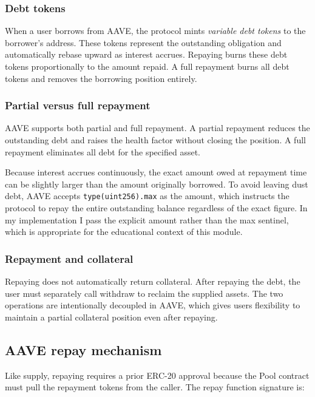 \subsubsection{Debt tokens}

When a user borrows from AAVE, the protocol mints \textit{variable debt tokens} to the borrower's address. These tokens represent the outstanding obligation and automatically rebase upward as interest accrues. Repaying burns these debt tokens proportionally to the amount repaid. A full repayment burns all debt tokens and removes the borrowing position entirely.

\subsubsection{Partial versus full repayment}

AAVE supports both partial and full repayment. A partial repayment reduces the outstanding debt and raises the health factor without closing the position. A full repayment eliminates all debt for the specified asset.

Because interest accrues continuously, the exact amount owed at repayment time can be slightly larger than the amount originally borrowed. To avoid leaving dust debt, AAVE accepts \texttt{type(uint256).max} as the amount, which instructs the protocol to repay the entire outstanding balance regardless of the exact figure. In my implementation I pass the explicit amount rather than the max sentinel, which is appropriate for the educational context of this module.

\subsubsection{Repayment and collateral}

Repaying does not automatically return collateral. After repaying the debt, the user must separately call withdraw to reclaim the supplied assets. The two operations are intentionally decoupled in AAVE, which gives users flexibility to maintain a partial collateral position even after repaying.

\subsection{AAVE repay mechanism}

Like supply, repaying requires a prior ERC-20 approval because the Pool contract must pull the repayment tokens from the caller. The repay function signature is:

